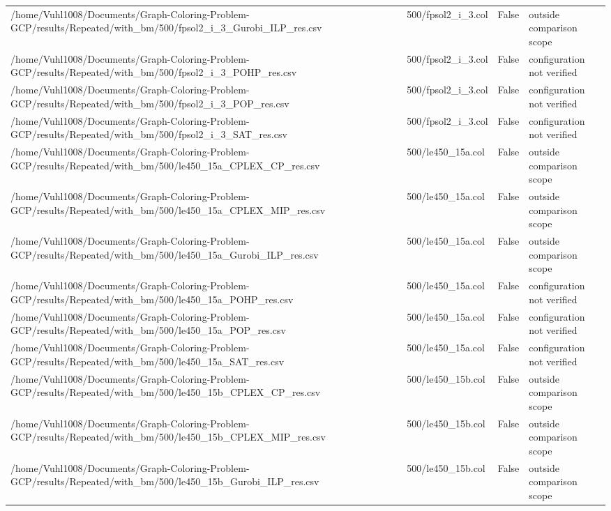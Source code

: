 \begin{table}[htbp]
\begin{tabular}{llll}
/home/Vuhl1008/Documents/Graph-Coloring-Problem-GCP/results/Repeated/with\_bm/500/fpsol2\_i\_3\_Gurobi\_ILP\_res.csv & 500/fpsol2\_i\_3.col & False & outside comparison scope \\
/home/Vuhl1008/Documents/Graph-Coloring-Problem-GCP/results/Repeated/with\_bm/500/fpsol2\_i\_3\_POHP\_res.csv & 500/fpsol2\_i\_3.col & False & configuration not verified \\
/home/Vuhl1008/Documents/Graph-Coloring-Problem-GCP/results/Repeated/with\_bm/500/fpsol2\_i\_3\_POP\_res.csv & 500/fpsol2\_i\_3.col & False & configuration not verified \\
/home/Vuhl1008/Documents/Graph-Coloring-Problem-GCP/results/Repeated/with\_bm/500/fpsol2\_i\_3\_SAT\_res.csv & 500/fpsol2\_i\_3.col & False & configuration not verified \\
/home/Vuhl1008/Documents/Graph-Coloring-Problem-GCP/results/Repeated/with\_bm/500/le450\_15a\_CPLEX\_CP\_res.csv & 500/le450\_15a.col & False & outside comparison scope \\
/home/Vuhl1008/Documents/Graph-Coloring-Problem-GCP/results/Repeated/with\_bm/500/le450\_15a\_CPLEX\_MIP\_res.csv & 500/le450\_15a.col & False & outside comparison scope \\
/home/Vuhl1008/Documents/Graph-Coloring-Problem-GCP/results/Repeated/with\_bm/500/le450\_15a\_Gurobi\_ILP\_res.csv & 500/le450\_15a.col & False & outside comparison scope \\
/home/Vuhl1008/Documents/Graph-Coloring-Problem-GCP/results/Repeated/with\_bm/500/le450\_15a\_POHP\_res.csv & 500/le450\_15a.col & False & configuration not verified \\
/home/Vuhl1008/Documents/Graph-Coloring-Problem-GCP/results/Repeated/with\_bm/500/le450\_15a\_POP\_res.csv & 500/le450\_15a.col & False & configuration not verified \\
/home/Vuhl1008/Documents/Graph-Coloring-Problem-GCP/results/Repeated/with\_bm/500/le450\_15a\_SAT\_res.csv & 500/le450\_15a.col & False & configuration not verified \\
/home/Vuhl1008/Documents/Graph-Coloring-Problem-GCP/results/Repeated/with\_bm/500/le450\_15b\_CPLEX\_CP\_res.csv & 500/le450\_15b.col & False & outside comparison scope \\
/home/Vuhl1008/Documents/Graph-Coloring-Problem-GCP/results/Repeated/with\_bm/500/le450\_15b\_CPLEX\_MIP\_res.csv & 500/le450\_15b.col & False & outside comparison scope \\
/home/Vuhl1008/Documents/Graph-Coloring-Problem-GCP/results/Repeated/with\_bm/500/le450\_15b\_Gurobi\_ILP\_res.csv & 500/le450\_15b.col & False & outside comparison scope \\

\end{tabular}
\end{table}
